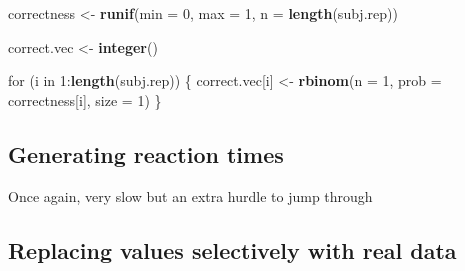 \documentclass[]{article}
\newenvironment{Shaded}{\begin{snugshade}}{\end{snugshade}}
\newcommand{\KeywordTok}[1]{\textcolor[rgb]{0.13,0.29,0.53}{\textbf{{#1}}}}
\newcommand{\DataTypeTok}[1]{\textcolor[rgb]{0.13,0.29,0.53}{{#1}}}
\newcommand{\DecValTok}[1]{\textcolor[rgb]{0.00,0.00,0.81}{{#1}}}
\newcommand{\StringTok}[1]{\textcolor[rgb]{0.31,0.60,0.02}{{#1}}}
\newcommand{\CommentTok}[1]{\textcolor[rgb]{0.56,0.35,0.01}{\textit{{#1}}}}
\newcommand{\OtherTok}[1]{\textcolor[rgb]{0.56,0.35,0.01}{{#1}}}
\newcommand{\NormalTok}[1]{{#1}}
\begin{document}
\begin{Shaded}
\begin{Highlighting}[]
\NormalTok{correctness <-}\StringTok{ }\KeywordTok{runif}\NormalTok{(}\DataTypeTok{min =} \DecValTok{0}\NormalTok{, }\DataTypeTok{max  =} \DecValTok{1}\NormalTok{, }\DataTypeTok{n =} \KeywordTok{length}\NormalTok{(subj.rep))}

\NormalTok{correct.vec <-}\StringTok{ }\KeywordTok{integer}\NormalTok{()}

\NormalTok{for (i in }\DecValTok{1}\NormalTok{:}\KeywordTok{length}\NormalTok{(subj.rep)) \{}
  \NormalTok{correct.vec[i] <-}\StringTok{ }\KeywordTok{rbinom}\NormalTok{(}\DataTypeTok{n =} \DecValTok{1}\NormalTok{, }\DataTypeTok{prob =} \NormalTok{correctness[i], }\DataTypeTok{size =} \DecValTok{1}\NormalTok{)}
\NormalTok{\}}
\end{Highlighting}
\end{Shaded}

\subsection{Generating reaction times}\label{generating-reaction-times}

Once again, very slow but an extra hurdle to jump through

\subsection{Replacing values selectively with real
data}\label{replacing-values-selectively-with-real-data}

\begin{Shaded}
\end{Shaded}
\end{document}
